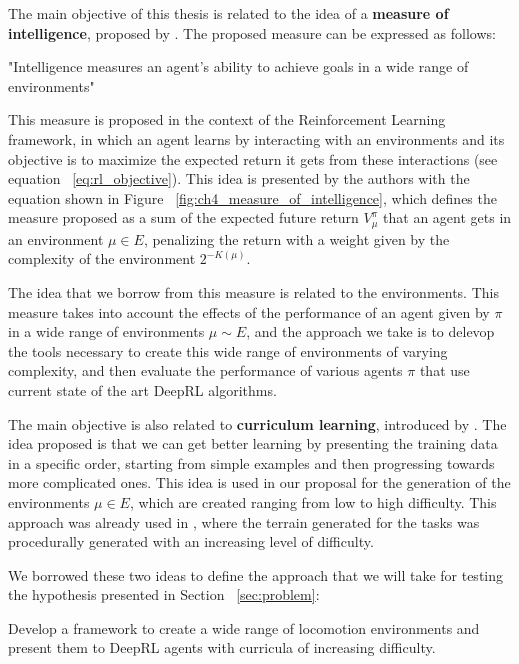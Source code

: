 The main objective of this thesis is related to the idea of a \textbf{measure of intelligence},
proposed by \cite{UniversalIntelligence}. The proposed measure can be expressed as follows:

\begin{centerItalic}
    "Intelligence measures an agent's ability to achieve goals in a 
     wide range of environments"
\end{centerItalic}

This measure is proposed in the context of the Reinforcement Learning framework, in
which an agent learns by interacting with an environments and its objective is to maximize
the expected return it gets from these interactions (see equation ~\ref{eq:rl_objective}).
This idea is presented by the authors with the equation shown in Figure ~\ref{fig:ch4_measure_of_intelligence}, 
which defines the measure proposed as a sum of the expected future return $V^{\pi}_{\mu}$ 
that an agent gets in an environment $\mu \in E$, penalizing the return with a weight 
given by the complexity of the environment $2^{-K(\mu)}$.

\figMeasureIntelligence

The idea that we borrow from this measure is related to the environments. This measure
takes into account the effects of the performance of an agent given by $\pi$ in a wide range of
environments $\mu \sim E$, and the approach we take is to delevop the tools necessary
to create this wide range of environments of varying complexity, and then evaluate the 
performance of various agents $\pi$ that use current state of the art DeepRL algorithms.

The main objective is also related to  \textbf{curriculum learning}, introduced
by \cite{CurriculumLearningBengio}. The idea proposed is that we can get better
learning by presenting the training data in a specific order, starting from simple
examples and then progressing towards more complicated ones. This idea is used
in our proposal for the generation of the environments $\mu \in E$, which are
created ranging from low to high difficulty. This approach was already used in 
\cite{DeepmindEmergenceLocomotion}, where the terrain generated for the tasks was 
procedurally generated with an increasing level of difficulty.

We borrowed these two ideas to define the approach that we will take for testing
the hypothesis presented in Section ~\ref{sec:problem}:

\begin{centerItalic}
    Develop a framework to create a wide range of locomotion environments and present 
    them to DeepRL agents with curricula of increasing difficulty.
\end{centerItalic}

